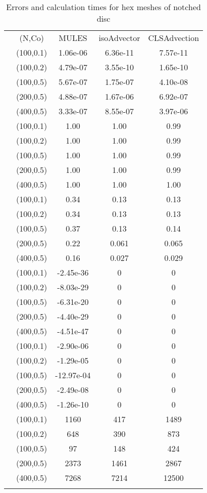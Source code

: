 \begin{table}
\centering
\caption{Errors and calculation times for hex meshes of notched disc}
\label{Tab:01}
\begin{tabular}{ccccc}
\hline\noalign{\smallskip}
\quad &(N,Co) & MULES &isoAdvector &CLSAdvection  \\
\noalign{\smallskip}\hline\noalign{\smallskip}
\multirow{5}{*}{$\varepsilon_{V}$}
&(100,0.1)& 1.06e-06 &6.36e-11 &7.57e-11  \\
&(100,0.2) & 4.79e-07 &3.55e-10 &1.65e-10\\
&(100,0.5)& 5.67e-07 &1.75e-07 &4.10e-08\\
&(200,0.5) & 4.88e-07 &1.67e-06 &6.92e-07\\
&(400,0.5) & 3.33e-07 &8.55e-07 &3.97e-06\\
\hline\noalign{\smallskip}
\multirow{5}{*}{$\varepsilon_{M}$}
&(100,0.1)& 1.00 &1.00 &0.99  \\
&(100,0.2) & 1.00 &1.00 &0.99\\
&(100,0.5)& 1.00 &1.00 &0.99\\
&(200,0.5) & 1.00 &1.00 &0.99\\
&(400,0.5) & 1.00 &1.00 &1.00\\
\hline\noalign{\smallskip}
\multirow{5}{*}{$\varepsilon_{S}$}
&(100,0.1)& 0.34 &0.13 &0.13  \\
&(100,0.2) & 0.34 &0.13 &0.13\\
&(100,0.5)& 0.37 &0.13 &0.14\\
&(200,0.5) & 0.22 &0.061 &0.065\\
&(400,0.5) & 0.16 &0.027 &0.029\\
\hline\noalign{\smallskip}
\multirow{5}{*}{$\min(\alpha)$}
&(100,0.1)& -2.45e-36 &0 &0  \\
&(100,0.2) & -8.03e-29 &0 &0\\
&(100,0.5)& -6.31e-20 &0 &0\\
&(200,0.5) & -4.40e-29 &0 &0\\
&(400,0.5) & -4.51e-47 &0 &0\\
\hline\noalign{\smallskip}
\multirow{5}{*}{$\max(\alpha)-1$}
&(100,0.1)& -2.90e-06 &0 &0  \\
&(100,0.2) & -1.29e-05 &0 &0 \\
&(100,0.5)& -12.97e-04 &0 &0\\
&(200,0.5) & -2.49e-08 &0 &0\\
&(400,0.5) & -1.26e-10 &0 &0\\
\hline\noalign{\smallskip}
\multirow{5}{*}{$T_{calc}$}
&(100,0.1)& 1160 &417 &1489  \\
&(100,0.2) & 648 &390 &873\\
&(100,0.5)& 97 &148 &424\\
&(200,0.5) & 2373 &1461 &2867\\
&(400,0.5) & 7268 &7214 &12500\\
\noalign{\smallskip}\hline
\end{tabular}
\end{table}
